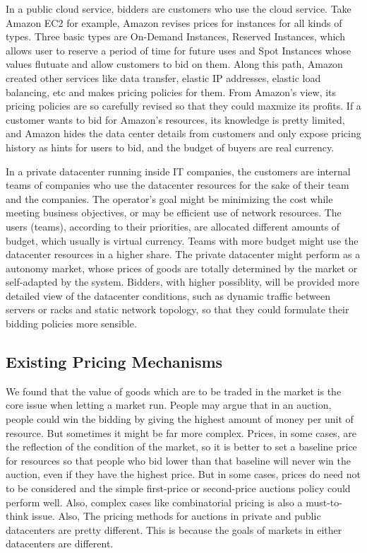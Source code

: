 \documentclass[11pt]{article}
\begin{document}
In a public cloud service, bidders are customers who use the cloud service. Take Amazon EC2 for example\cite{ec2}, Amazon revises prices for instances for all kinds
of types. Three basic types are On-Demand Instances, Reserved Instances, which allows user to reserve a period of time for future uses and Spot Instances\cite{spot} whose values 
flutuate and allow customers to bid on them. Along this path, Amazon created other services like data transfer, elastic IP addresses, elastic load balancing, etc and 
makes pricing policies for them. From Amazon's view, its pricing policies are so carefully revised so that they could maxmize its profits. If a customer wants to bid for Amazon's 
resources, its knowledge is pretty limited, and Amazon hides the data center details from customers and only expose pricing history as hints for users to bid, and the budget
of buyers are real currency. 

In a private datacenter running inside IT companies, the customers are internal teams of companies who use the datacenter resources for the sake of their team and the companies.
The operator's goal might be minimizing the cost while meeting business objectives, or may be efficient use of network resources. The users (teams), according to their priorities,
are allocated different amounts of budget, which usually is virtual currency. Teams with more budget might use the datacenter resources in a higher share. The private datacenter 
might perform as a autonomy market, whose prices of goods are totally determined by the market or self-adapted by the system. Bidders, with higher possiblity, will be
provided more detailed view of the datacenter conditions, such as dynamic traffic between servers or racks and static network topology, so that they could formulate their 
bidding policies more sensible. 
\subsection{Existing Pricing Mechanisms}
We found that the value of goods which are to be traded in the market is the core issue when letting a market run. People may argue that in an auction,
people could win the bidding by giving the highest amount of money per unit of resource. But sometimes it might be far more complex. Prices, in some cases,
are the reflection of the condition of the market, so it is better to set a baseline price for resources so that people who bid lower than that baseline will
never win the auction, even if they have the highest price. But in some cases, prices do need not to be considered and the simple first-price or second-price auctions
policy could perform well. Also, complex cases like combinatorial pricing\cite{combinatorial auction} is also a must-to-think issue. Also, 
The pricing methods for auctions in private and public datacenters are pretty different. This is because the goals of markets in either datacenters are 
different. 
\end{document}

